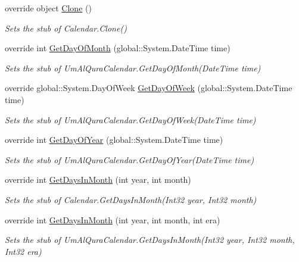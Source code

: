 \begin{DoxyCompactItemize}
override object \hyperlink{class_system_1_1_globalization_1_1_fakes_1_1_stub_um_al_qura_calendar_ad1cff5126f4150e54a0de09f242b444f}{Clone} ()
\begin{DoxyCompactList}\small\item\em Sets the stub of Calendar.\-Clone()\end{DoxyCompactList}\item 
override int \hyperlink{class_system_1_1_globalization_1_1_fakes_1_1_stub_um_al_qura_calendar_adde24476d40e8907f8b73598ec4d15ad}{Get\-Day\-Of\-Month} (global\-::\-System.\-Date\-Time time)
\begin{DoxyCompactList}\small\item\em Sets the stub of Um\-Al\-Qura\-Calendar.\-Get\-Day\-Of\-Month(\-Date\-Time time)\end{DoxyCompactList}\item 
override global\-::\-System.\-Day\-Of\-Week \hyperlink{class_system_1_1_globalization_1_1_fakes_1_1_stub_um_al_qura_calendar_a2a8b8320049a719657abad725fd13838}{Get\-Day\-Of\-Week} (global\-::\-System.\-Date\-Time time)
\begin{DoxyCompactList}\small\item\em Sets the stub of Um\-Al\-Qura\-Calendar.\-Get\-Day\-Of\-Week(\-Date\-Time time)\end{DoxyCompactList}\item 
override int \hyperlink{class_system_1_1_globalization_1_1_fakes_1_1_stub_um_al_qura_calendar_a10411ce960a7bd8d6ee296bf0c40cf27}{Get\-Day\-Of\-Year} (global\-::\-System.\-Date\-Time time)
\begin{DoxyCompactList}\small\item\em Sets the stub of Um\-Al\-Qura\-Calendar.\-Get\-Day\-Of\-Year(\-Date\-Time time)\end{DoxyCompactList}\item 
override int \hyperlink{class_system_1_1_globalization_1_1_fakes_1_1_stub_um_al_qura_calendar_aa0f30e09fe23d18720c1f1f8735da41a}{Get\-Days\-In\-Month} (int year, int month)
\begin{DoxyCompactList}\small\item\em Sets the stub of Calendar.\-Get\-Days\-In\-Month(\-Int32 year, Int32 month)\end{DoxyCompactList}\item 
override int \hyperlink{class_system_1_1_globalization_1_1_fakes_1_1_stub_um_al_qura_calendar_a7a9822d5995920f92b7b069f576babca}{Get\-Days\-In\-Month} (int year, int month, int era)
\begin{DoxyCompactList}\small\item\em Sets the stub of Um\-Al\-Qura\-Calendar.\-Get\-Days\-In\-Month(\-Int32 year, Int32 month, Int32 era)\end{DoxyCompactList}\item 

\end{DoxyCompactItemize}
